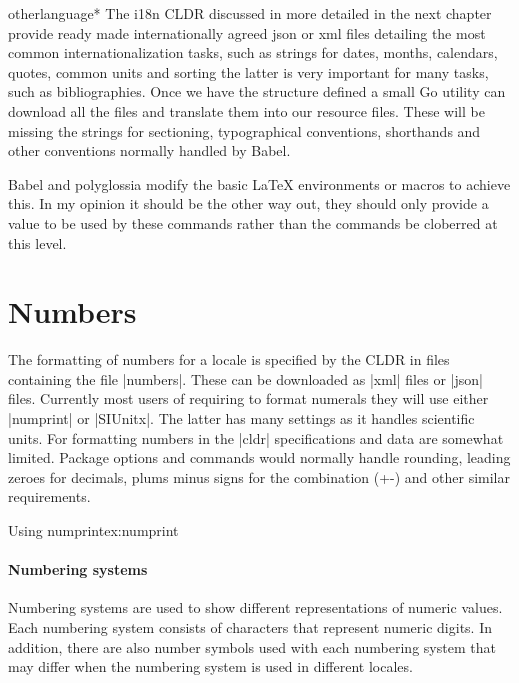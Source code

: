 \begin{docCommandd}{otherlanguage*} { }
The i18n CLDR discussed in more detailed in the next chapter provide ready made internationally agreed json or xml files
detailing the most common internationalization tasks, such as strings for dates, months, calendars, quotes, common units and
sorting the latter is very important for many tasks, such as bibliographies. Once we have the structure defined
a small Go utility can download all the files and translate them into our resource files. These will be missing the
strings for sectioning, typographical conventions, shorthands and other conventions normally handled by Babel. 

Babel and polyglossia modify the basic LaTeX environments or macros to achieve this. In my opinion it should be the other way out, they should only provide a value to be used by these commands rather than the commands be cloberred at this level.

\section{Numbers}

The formatting of numbers for a locale is specified by the CLDR in files containing the file |numbers|. These can be downloaded as |xml| files or |json| files.
Currently most users of \latexe requiring to format numerals they will use either |numprint| or |SIUnitx|. The latter has many settings as it handles scientific units. For formatting numbers in \latexe the |cldr| specifications and data are somewhat limited. Package options and commands
would normally handle rounding, leading zeroes for decimals, plums minus signs for the combination (+-) and other similar requirements.



\begin{texexample}{Using numprint}{ex:numprint}

\end{texexample}



\paragraph{Numbering systems}

Numbering systems are used to show different representations of numeric values. Each numbering system consists of characters that represent numeric digits. In addition, there are also number symbols used with each numbering system that may differ when the numbering system is used in different locales.


\end{docCommandd}
